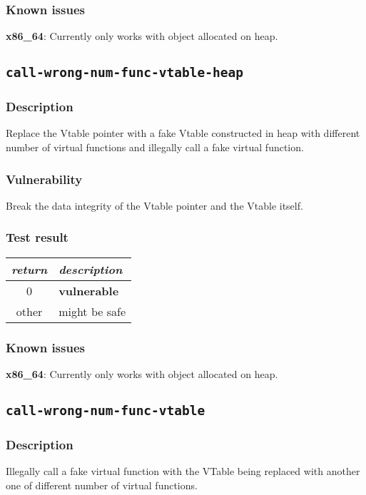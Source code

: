 \documentclass[a4paper]{book}
\begin{document}
\subsubsection{Known issues}

\textbf{x86\_64}: Currently only works with object allocated on heap.


\newpage
\subsection{\texttt{call-wrong-num-func-vtable-heap}}\label{test-call-wrong-num-func-vtable-heap}

\subsubsection{Description}
Replace the Vtable pointer with a fake Vtable constructed in heap with different number of virtual functions and
illegally call a fake virtual function.

\subsubsection{Vulnerability}
Break the data integrity of the Vtable pointer and the Vtable itself.

\subsubsection{Test result}
\begin{tabular}{cl}
  \toprule
  \emph{return}  & \emph{description} \\
  \midrule
  0              & \textbf{vulnerable} \\
  other          & might be safe \\
  \bottomrule
\end{tabular}

\subsubsection{Known issues}

\textbf{x86\_64}: Currently only works with object allocated on heap.

\newpage
\subsection{\texttt{call-wrong-num-func-vtable}}\label{test-call-wrong-num-func-vtable}

\subsubsection{Description}
Illegally call a fake virtual function with the VTable being replaced with another one of different number of virtual functions.
\end{document}
